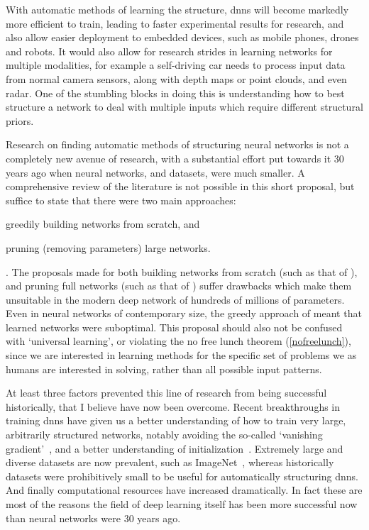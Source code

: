 \documentclass[thesis]{subfiles}
\begin{document}
With automatic methods of learning the structure, \glspl{dnn} will become markedly more efficient to train, leading to faster experimental results for research, and also allow easier deployment to embedded devices, such as mobile phones, drones and robots. It would also allow for research strides in learning networks for multiple modalities, for example a self-driving car needs to process input data from normal camera sensors, along with depth maps or point clouds, and even radar. One of the stumbling blocks in doing this is understanding how to best structure a network to deal with multiple inputs which require different structural priors.

Research on finding automatic methods of structuring neural networks is not a completely new avenue of research, with a substantial effort put towards it 30 years ago when neural networks, and datasets, were much smaller. A comprehensive review of the literature is not possible in this short proposal, but suffice to state that there were two main approaches:
\begin{enumerate*}[label= (\textbf{\roman*})]
	\item greedily building networks from scratch, and 
	\item pruning (removing parameters) large networks.
\end{enumerate*}. The proposals made for both building networks from scratch (such as that of \citet{Fahlman1989}), and pruning full networks (such as that of \citet{lecun1989optimal}) suffer drawbacks which make them unsuitable in the modern deep network of hundreds of millions of parameters. Even in neural networks of contemporary size, the greedy approach of \citet{Fahlman1989} meant that learned networks were suboptimal. This proposal should also not be confused with `universal learning', or violating the no free lunch theorem (\cref{nofreelunch}), since we are interested in learning methods for the specific set of problems we as humans are interested in solving, rather than all possible input patterns.

At least three factors prevented this line of research from being successful historically, that I believe have now been overcome. Recent breakthroughs in training \glspl{dnn} have given us a better understanding of how to train very large, arbitrarily structured networks, notably avoiding the so-called `vanishing gradient'~\citep{Ioffe2015,He2016}, and a better understanding of initialization~\citep{He2015b}. Extremely large and diverse datasets are now prevalent, such as ImageNet~\citep{ILSVRC2015}, whereas historically datasets were prohibitively small to be useful for automatically structuring \glspl{dnn}. And finally computational resources have increased dramatically. In fact these are most of the reasons the field of deep learning itself has been more successful now than neural networks were 30 years ago.
\end{document}
